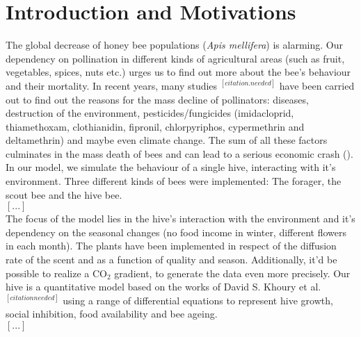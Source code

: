 \section{Introduction and Motivations}
The global decrease of honey bee populations (\textit{Apis mellifera}) is alarming. Our dependency on pollination in different kinds of agricultural areas (such as fruit, vegetables, spices, nuts etc.) urges us to find out more about the bee's behaviour and their mortality. In recent years, many studies $^{[citation.needed]}$ have been carried out to find out the reasons for the mass decline of pollinators: diseases, destruction of the environment, pesticides/fungicides (imidacloprid, thiamethoxam, clothianidin, fipronil, chlorpyriphos, cypermethrin and deltamethrin) and maybe even climate change. The sum of all these factors culminates in the mass death of bees and can lead to a serious economic crash ().\\
In our model, we simulate the behaviour of a single hive, interacting with it's environment. Three different kinds of bees were implemented: The forager, the scout bee and the hive bee. \\
$[...]$\\
The focus of the model lies in the hive's interaction with the environment and it's dependency on the seasonal changes (no food income in winter, different flowers in each month). The plants have been implemented in respect of the diffusion rate of the scent and as a function of quality and season. Additionally, it'd be possible to realize a CO$_{2}$ gradient, to generate the data even more precisely. Our hive is a quantitative model based on the works of David S. Khoury et al. $^[citation needed]$ using a range of differential equations to represent hive growth, social inhibition, food availability and bee ageing.  
\\
$[...]$\\

